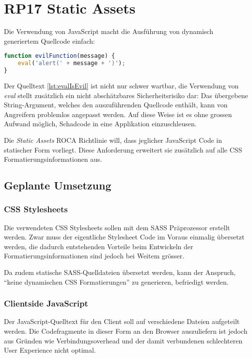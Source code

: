 \section{RP17 Static Assets}
\label{sec:principle-rp17-static-assets}

Die Verwendung von JavaScript macht die Ausführung von dynamisch generiertem Quellcode einfach:

\begin{lstlisting}[language=JavaScript, caption={Ausführung von dynamischem Quelltext mittels \emph{eval}}, label={lst:evalIsEvil}]
function evilFunction(message) {
	eval('alert(' + message + ')');
}
\end{lstlisting}

Der Quelltext \ref{lst:evalIsEvil} ist nicht nur schwer wartbar, die Verwendung von \emph{eval} \cite{mdnEval} stellt zusätzlich ein nicht abschätzbares Sicherheitsrisiko dar: Das übergebene String-Argument, welches den auszuführenden Quellcode enthält, kann von Angreifern problemlos angepasst werden. Auf diese Weise ist es ohne grossen Aufwand möglich, Schadcode in eine Applikation einzuschleusen.

Die \emph{Static Assets} ROCA Richtlinie will, dass jeglicher JavaScript Code in statischer Form vorliegt. Diese Anforderung erweitert sie zusätzlich auf alle CSS Formatierungsinformationen aus.

\subsection*{Geplante Umsetzung}
\subsubsection*{CSS Stylesheets}
Die verwendeten CSS Stylesheets sollen mit dem SASS Präprozessor \cite{SASS} erstellt werden. Zwar muss der eigentliche Stylesheet Code im Voraus einmalig übersetzt werden, die dadurch entstehenden Vorteile beim Entwickeln der Formatierungsinformationen sind jedoch bei Weitem grösser.

Da zudem statische SASS-Quelldateien übersetzt werden, kann der Anspruch, ``keine dynamischen CSS Formatierungen'' zu generieren, befriedigt werden.

\subsubsection*{Clientside JavaScript}
Der JavaScript-Quelltext für den Client soll auf verschiedene Dateien aufgeteilt werden. Die Codefragmente in dieser Form an den Browser auszuliefern ist jedoch aus Gründen wie Verbindungsoverhead und der damit verbundenen schlechteren User Experience nicht optimal.

